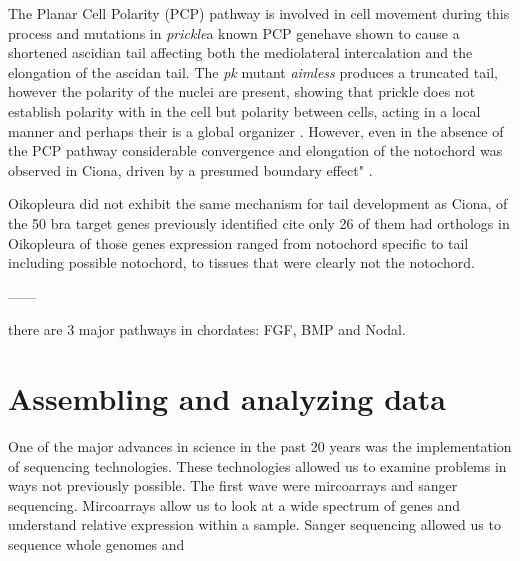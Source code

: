 The Planar Cell Polarity (PCP) pathway is involved in cell movement during this process and mutations in \textit{prickle}\textemdash a known PCP gene\textemdash have shown to cause a shortened ascidian tail affecting both the mediolateral intercalation and the elongation of the ascidan tail\cite{jiang_ascidian_2005}. The \textit{pk} mutant \textit{aimless} produces a truncated tail, however the polarity of the nuclei are present, showing that prickle does not establish polarity with in the cell but polarity between cells, acting in a local manner and perhaps their is a global organizer \cite{jiang_ascidian_2005,kourakis_one-dimensional_2014}. However, even in the absence of the PCP pathway considerable convergence and elongation of the notochord was observed in Ciona, driven by a presumed boundary effect" \cite{veeman_chongmague_2008}.

Oikopleura did not exhibit the same mechanism for tail development as Ciona, of the 50 bra target genes previously identified cite only 26 of them had orthologs in Oikopleura \cite{kugler_evolutionary_2011} of those genes expression ranged from notochord specific to tail including possible notochord, to tissues that were clearly not the notochord.

------


there are 3 major pathways in chordates: FGF, BMP and Nodal.


\section{Assembling and analyzing data}
One of the major advances in science in the past 20 years was the implementation of sequencing technologies. These technologies allowed us to examine problems in ways not previously possible. The first wave were mircoarrays and sanger sequencing. Mircoarrays allow us to look at a wide spectrum of genes and understand relative expression within a sample. Sanger sequencing allowed us to sequence whole genomes and 
